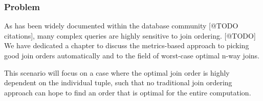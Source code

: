 \documentclass[../catalog.tex]{subfiles}
\begin{document}
\subsubsection{Problem}

As has been widely documented within the database community [@TODO
citations], many complex queries are highly sensitive to join
ordering. [@TODO] We have dedicated a chapter to discuss the
metrics-based approach to picking good join orders automatically and
to the field of worst-case optimal n-way joins.

This scenario will focus on a case where the optimal join order is
highly dependent on the individual tuple, such that no traditional
join ordering approach can hope to find an order that is optimal for
the entire computation.
\end{document}
